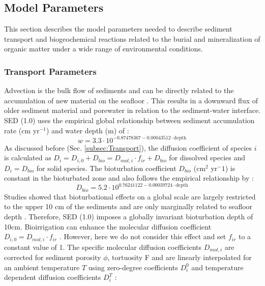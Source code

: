 \documentclass[gmd, manuscript]{copernicus}
\begin{document}
\subsection{Model Parameters}
This section describes the model parameters needed to describe sediment transport and biogeochemical reactions related to the burial and mineralization of organic matter under a wide range of environmental conditions. 
\subsubsection{Transport Parameters}
Advection is the bulk flow of sediments and can be directly related to the accumulation of new material on the seafloor \citep[i.e. sedimentation,][]{burdige2006geochemistry}. 
This results in a downward flux of older sediment material and porewater in relation to the sediment-water interface. SED (1.0) uses the empirical global relationship between 
sediment accumulation rate (cm yr$^{-1}$) and water depth (m) of \citet{middelburg_empirical_1997}: 
\begin{equation}
 w = 3.3\cdot 10^{-0.87478367-0.00043512\cdot \text{depth}}\label{eq:sedimentation_rate}
\end{equation}
As discussed before (Sec. \ref{subsec:Transport}), the diffusion coefficient of species $i$ is calculated as $D_i=D_{i,0}+D_{bio}=D_{mol,i}\cdot f_{ir}+D_{bio}$ for dissolved species and $D_i=D_{bio}$ for solid species. 
The bioturbation coefficient $D_{bio}$ (cm$^2$ yr$^-1$) is constant in the bioturbated zone and also follows the empirical relationship by \citet{middelburg_empirical_1997}:
\begin{equation}
 D_{bio} = 5.2\cdot 10^{0.76241122-0.00039724\cdot \text{depth}}\label{eq:bioturbation_coeff}
\end{equation}
Studies showed that bioturbational effects on a global scale are largely restricted to the upper 10 cm of the sediments and are only marginally related to seafloor depth \citep[e.g.][]{boudreau_mean_1998, teal_global_2010}. 
Therefore, SED (1.0) imposes a globally invariant bioturbation depth of 10cm. 
Bioirrigation can enhance the molecular diffusion coefficient $D_{i,0}=D_{mol,i}\cdot f_{ir}$ \citep{soetaert1996dynamic}. However, here we do not consider this effect 
and set $f_{ir}$ to a constant value of 1. The specific molecular diffusion coefficients $D_{mol,i}$ are corrected for sediment porosity $\phi$, tortuosity F and are linearly interpolated for an ambient temperature $T$ using zero-degree 
coefficients $D^0_i$ and temperature dependent diffusion coefficients $D^T_i$ \citep[compare ][]{gypens_simple_2008}:
\end{document}
